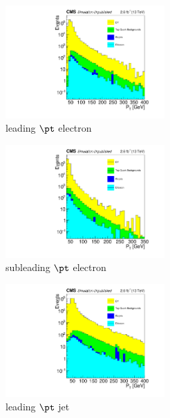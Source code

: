 \begin{figure}
	\centering
	\begin{subfigure}[t]{2.4in}
		\centering
		\includegraphics[width=2.4in]{figures/l1_pt_LooseSelection_TwoLeptsAndJets_EEChannelBkgndMC_log.pdf}
		\caption{leading $\pt$ electron}\label{fig:bkgLeptJetPtsa}
	\end{subfigure}
	\thickspace
	\begin{subfigure}[t]{2.4in}
		\centering
		\includegraphics[width=2.4in]{figures/l2_pt_LooseSelection_TwoLeptsAndJets_EEChannelBkgndMC_log.pdf}
		\caption{subleading $\pt$ electron}\label{fig:bkgLeptJetPtsb}
	\end{subfigure}
	\newline
	\newline
	\newline
	\newline
	\begin{subfigure}[t]{2.4in}
		\centering
		\includegraphics[width=2.4in]{figures/j1_pt_LooseSelection_TwoLeptsAndJets_EEChannelBkgndMC_log.pdf}
		\caption{leading $\pt$ jet}\label{fig:bkgLeptJetPtsc}
	\end{subfigure}
	\thickspace
	\begin{subfigure}[t]{2.4in}

\end{subfigure}
\end{figure}
